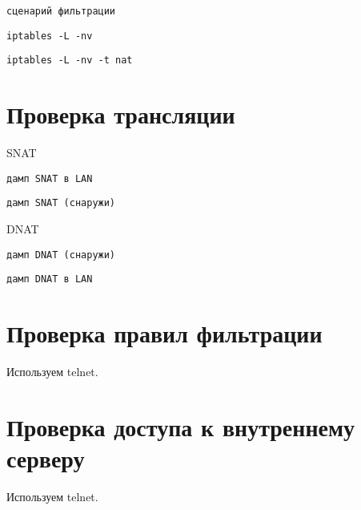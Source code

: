 \documentclass[a4paper,12pt]{article}
\begin{document}
\begin{Verbatim}
сценарий фильтрации
\end{Verbatim}

\begin{Verbatim}
iptables -L -nv
\end{Verbatim}

\begin{Verbatim}
iptables -L -nv -t nat
\end{Verbatim}

\section{Проверка трансляции}

SNAT

\begin{Verbatim}
дамп SNAT в LAN
\end{Verbatim}

\begin{Verbatim}
дамп SNAT (снаружи)
\end{Verbatim}

DNAT

\begin{Verbatim}
дамп DNAT (снаружи)
\end{Verbatim}

\begin{Verbatim}
дамп DNAT в LAN
\end{Verbatim}


\section{Проверка правил фильтрации}

Используем telnet.

\section{Проверка доступа к внутреннему серверу}

Используем telnet.
\end{document}
